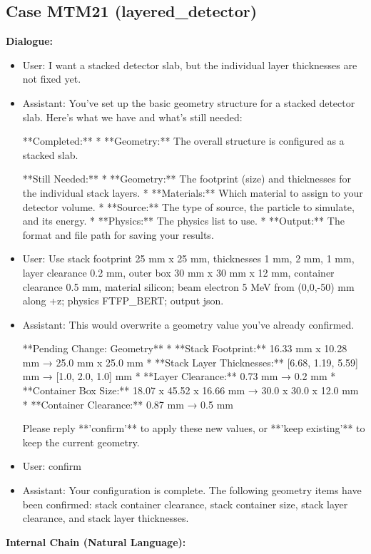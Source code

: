 \documentclass[11pt]{ctexart}
\begin{document}
\subsection{Case MTM21 (layered\_detector)}
\textbf{Dialogue:}
\begin{itemize}
\item User: I want a stacked detector slab, but the individual layer thicknesses are not fixed yet.
\item Assistant: You've set up the basic geometry structure for a stacked detector slab. Here's what we have and what's still needed:

**Completed:**
*   **Geometry:** The overall structure is configured as a stacked slab.

**Still Needed:**
*   **Geometry:** The footprint (size) and thicknesses for the individual stack layers.
*   **Materials:** Which material to assign to your detector volume.
*   **Source:** The type of source, the particle to simulate, and its energy.
*   **Physics:** The physics list to use.
*   **Output:** The format and file path for saving your results.
\item User: Use stack footprint 25 mm x 25 mm, thicknesses 1 mm, 2 mm, 1 mm, layer clearance 0.2 mm, outer box 30 mm x 30 mm x 12 mm, container clearance 0.5 mm, material silicon; beam electron 5 MeV from (0,0,-50) mm along +z; physics FTFP\_BERT; output json.
\item Assistant: This would overwrite a geometry value you've already confirmed.

**Pending Change: Geometry**
*   **Stack Footprint:** 16.33 mm x 10.28 mm → 25.0 mm x 25.0 mm
*   **Stack Layer Thicknesses:** [6.68, 1.19, 5.59] mm → [1.0, 2.0, 1.0] mm
*   **Layer Clearance:** 0.73 mm → 0.2 mm
*   **Container Box Size:** 18.07 x 45.52 x 16.66 mm → 30.0 x 30.0 x 12.0 mm
*   **Container Clearance:** 0.87 mm → 0.5 mm

Please reply **'confirm'** to apply these new values, or **'keep existing'** to keep the current geometry.
\item User: confirm
\item Assistant: Your configuration is complete. The following geometry items have been confirmed: stack container clearance, stack container size, stack layer clearance, and stack layer thicknesses.
\end{itemize}
\textbf{Internal Chain (Natural Language):}
\end{document}

